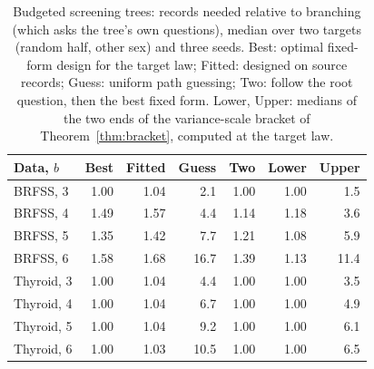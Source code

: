 \begin{table}[t]
\centering
\caption{Budgeted screening trees: records needed relative to branching (which asks the tree's own questions), median over two targets (random half, other sex) and three seeds. Best: optimal fixed-form design for the target law; Fitted: designed on source records; Guess: uniform path guessing; Two: follow the root question, then the best fixed form. Lower, Upper: medians of the two ends of the variance-scale bracket of Theorem~\ref{thm:bracket}, computed at the target law.}
\label{tab:screening}
\small
\setlength{\tabcolsep}{3.2pt}
\begin{tabular}{lrrrrrr}
\toprule
Data, $b$ & Best & Fitted & Guess & Two & Lower & Upper \\
\midrule
BRFSS, 3 & 1.00 & 1.04 & 2.1 & 1.00 & 1.00 & 1.5 \\
BRFSS, 4 & 1.49 & 1.57 & 4.4 & 1.14 & 1.18 & 3.6 \\
BRFSS, 5 & 1.35 & 1.42 & 7.7 & 1.21 & 1.08 & 5.9 \\
BRFSS, 6 & 1.58 & 1.68 & 16.7 & 1.39 & 1.13 & 11.4 \\
Thyroid, 3 & 1.00 & 1.04 & 4.4 & 1.00 & 1.00 & 3.5 \\
Thyroid, 4 & 1.00 & 1.04 & 6.7 & 1.00 & 1.00 & 4.9 \\
Thyroid, 5 & 1.00 & 1.04 & 9.2 & 1.00 & 1.00 & 6.1 \\
Thyroid, 6 & 1.00 & 1.03 & 10.5 & 1.00 & 1.00 & 6.5 \\
\bottomrule
\end{tabular}
\end{table}
